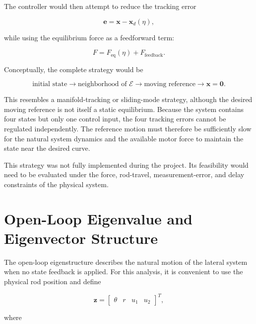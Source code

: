 The controller would then attempt to reduce the tracking error

\begin{equation}
\mathbf{e}
=
\mathbf{x}-\mathbf{x}_d(\eta),
\end{equation}

while using the equilibrium force as a feedforward term:

\begin{equation}
F
=
F_{\mathrm{eq}}(\eta)
+
F_{\mathrm{feedback}}.
\label{eq:equilibrium-curve-control-force}
\end{equation}

Conceptually, the complete strategy would be

\begin{equation}
\text{initial state}
\longrightarrow
\text{neighborhood of }\mathcal{E}
\longrightarrow
\text{moving reference}
\longrightarrow
\mathbf{x}=\mathbf{0}.
\end{equation}

This resembles a manifold-tracking or sliding-mode strategy, although the desired moving reference is not itself a static equilibrium. Because the system contains four states but only one control input, the four tracking errors cannot be regulated independently. The reference motion must therefore be sufficiently slow for the natural system dynamics and the available motor force to maintain the state near the desired curve.

This strategy was not fully implemented during the project. Its feasibility would need to be evaluated under the force, rod-travel, measurement-error, and delay constraints of the physical system.

\section{Open-Loop Eigenvalue and Eigenvector Structure}
\label{sec:further-open-loop-eigenvalues}

The open-loop eigenstructure describes the natural motion of the lateral system when no state feedback is applied. For this analysis, it is convenient to use the physical rod position and define

\begin{equation}
\mathbf{z}
=
\begin{bmatrix}
\theta &
r &
u_1 &
u_2
\end{bmatrix}^{T},
\end{equation}

where

